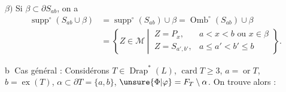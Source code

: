 $\beta)$ Si $\beta\subset\partial S_{ab}$, on a
\[
\begin{aligned}
\operatorname{supp}^{\circ}(S_{ab}\cup\beta)&=\operatorname{supp}^{\circ}(S_{ab})\cup\beta=\operatorname{Omb}^{\circ}(S_{ab})\cup\beta\\
&=\left\{Z\in\mathscr{M}\ \left|\
\begin{array}{ll}
Z=P_x,&a<x<b\text{ ou }x\in\beta\\
Z=S_{a',b'},&a\leq a'<b'\leq b
\end{array}\right.\right\}.
\end{aligned}
\]

\textcircled{b} Cas général : Considérons $T\in\operatorname{Drap}^{*}(L)$, $\operatorname{card}T\geq3$, \deleted{$\alpha\in$} $a=\operatorname{or}T$, $b=\operatorname{ex}(T)$, \deleted{$\alpha$} $\alpha\subset\partial T=\{a,b\}$,  $\unsure{\Phi|\varphi}=F_T\setminus\alpha$. On trouve alors :
